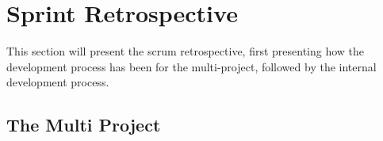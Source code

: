 \section{Sprint Retrospective}

This section will present the scrum retrospective, first presenting how the development process has been for the multi-project, followed by the internal development process.

\subsection*{The Multi Project}
